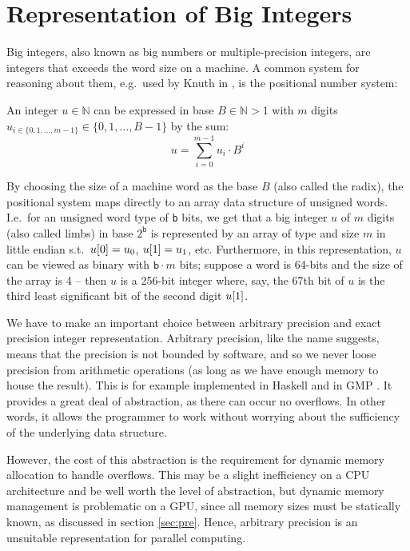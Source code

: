 \section{Representation of Big Integers}
\label{sec:big}
Big integers, also known as big numbers or multiple-precision integers, are
integers that exceeds the word size on a machine. A common system for reasoning
about them, e.g.\ used by Knuth in \cite{knuth97}, is the positional number
system:

\begin{definition}\label{def:bigints}
  An integer $u \in \mathbb{N}$ can be expressed in base $B \in \mathbb{N}>1$ with
  $m$ digits $u_{i\in \{0,1,\ldots,m-1\}}\in\{0,1,\ldots,B-1\}$ by the sum:
  \begin{equation}
\label{eq:rep}
u = \sum_{i=0}^{m-1}u_i\cdot B^{i}
\end{equation}
\end{definition}

By choosing the size of a machine word as the base $B$ (also called the radix),
the positional system maps directly to an array data structure of unsigned
words. I.e.\ for an unsigned word type \uint{} of \texttt{b} bits, we get that a
big integer $u$ of $m$ digits (also called limbs) in base $2^{\mathtt{b}}$ is
represented by an array of type \uint{} and size $m$ in little endian s.t.\
$u\mathtt{[}0\mathtt{]} = u_0$, $u\mathtt{[}1\mathtt{]} = u_1$, etc. Furthermore, in this
representation, $u$ can be viewed as binary with ${\mathtt{b}\cdot m}$ bits; suppose
a word is 64-bits and the size of the array is 4 -- then $u$ is a 256-bit integer
where, say, the 67th bit of $u$ is the third least significant bit of the second
digit $u\mathtt{[}1\mathtt{]}$.

We have to make an important choice between arbitrary precision and exact
precision integer representation. Arbitrary precision, like the name suggests,
means that the precision is not bounded by software, and so we never loose
precision from arithmetic operations (as long as we have enough memory to house
the result). This is for example implemented in Haskell and in GMP
\cite{marlow2010haskell,GMP}. It provides a great deal of abstraction, as there
can occur no overflows. In other words, it allows the programmer to work without
worrying about the sufficiency of the underlying data structure.

However, the cost of this abstraction is the requirement for dynamic memory
allocation to handle overflows. This may be a slight inefficiency on a CPU
architecture and be well worth the level of abstraction, but dynamic memory
management is problematic on a GPU, since all memory sizes must be statically
known, as discussed in section \ref{sec:pre}. Hence, arbitrary precision is an
unsuitable representation for parallel computing.

